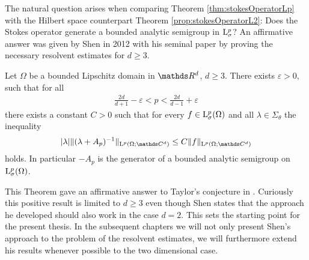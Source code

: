 The natural question arises when comparing Theorem \ref{thm:stokesOperatorLp} with the Hilbert space counterpart Theorem \ref{prop:stokesOperatorL2}: Does the Stokes operator generate a bounded analytic semigroup in $\mathrm{L}^p_\sigma$?
An affirmative answer was given by Shen in 2012 with his seminal paper \cite{Shen2012} by proving the necessary resolvent estimates for $d \geq 3$.

\begin{thm}[Shen]
  \label{thm:main}
  Let $\Omega$ be a bounded Lipschitz domain in $\R^d$, $d \geq 3$.
  There exists $\varepsilon > 0$, such that for all
  \begin{align*}
    \frac{2d}{d + 1} - \varepsilon < p < \frac{2d}{d - 1} + \varepsilon
  \end{align*}
  there exists a constant $C > 0$ such that for every $f \in \mathrm{L}^p_\sigma(\Omega)$ and all $\lambda \in \Sigma_\theta$ the inequality
  \begin{align*}
    |\lambda| \| (\lambda + A_p)^{-1} \|_{\Ell^p(\Omega; \C^d)} \leq C \|f\|_{\Ell^p(\Omega; \C^d)}
  \end{align*}
  holds. In particular $-A_p$ is the generator of a bounded analytic semigroup on $\mathrm{L}^p_\sigma(\Omega)$.
\end{thm}

This Theorem gave an affirmative answer to Taylor's conjecture in \cite{taylor}. 
Curiously this positive result is limited to $d \geq 3$ even though Shen states that the approach he developed should also work in the case $d = 2$.
This sets the starting point for the present thesis.
In the subsequent chapters we will not only present Shen's approach to the problem of the resolvent estimates, we will furthermore extend his results whenever possible to the two dimensional case.

